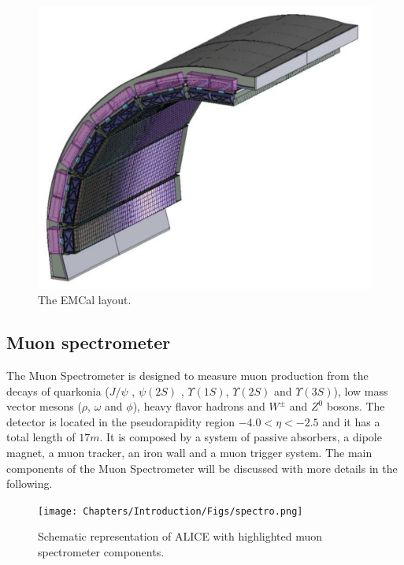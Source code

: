 \begin{figure}[!h]
\begin{center}
\includegraphics[width=0.5\linewidth]{Chapters/Introduction/Figs/emcal.png}
\caption{The EMCal layout.}
\label{fig:EMCAL}
\end{center}
\end{figure}

\subsection{Muon spectrometer}
The Muon Spectrometer is designed to measure muon production from the decays of quarkonia ($J/\psi$ , $\psi(2S)$ , $\Upsilon(1S)$, $\Upsilon(2S)$ and $\Upsilon(3S)$), low mass vector mesons ($\rho$, $\omega$ and $\phi$), heavy flavor hadrons and $W^\pm$ and $Z^0$ bosons. 
The detector is located in the pseudorapidity region $−4.0 < \eta < −2.5$ and it has a total length of $17 m$. 
It is composed by a system of passive absorbers, a dipole magnet, a muon tracker, an iron wall and a muon trigger system. 
The main components of the Muon Spectrometer will be discussed with more details in the following.

\begin{figure}[!h]
\begin{center}
\texttt{[image: Chapters/Introduction/Figs/spectro.png]}
\caption{Schematic representation of ALICE with highlighted muon spectrometer components.}
\label{fig:spectro}
\end{center}
\end{figure}


